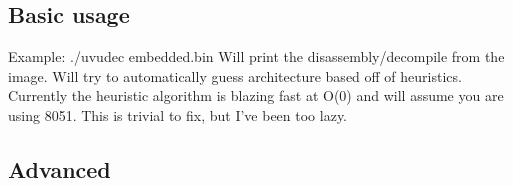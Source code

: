\subsection{Basic usage}
\label{sec::uvudec::basic_usage}

Example:
./uvudec embedded.bin
Will print the disassembly/decompile from the image.  
Will try to automatically guess architecture based off of heuristics.
Currently the heuristic algorithm is blazing fast at O(0) and will assume you are using 8051.
This is trivial to fix, but I've been too lazy.

\subsection{Advanced}
\label{sec::uvudec::advanced}
